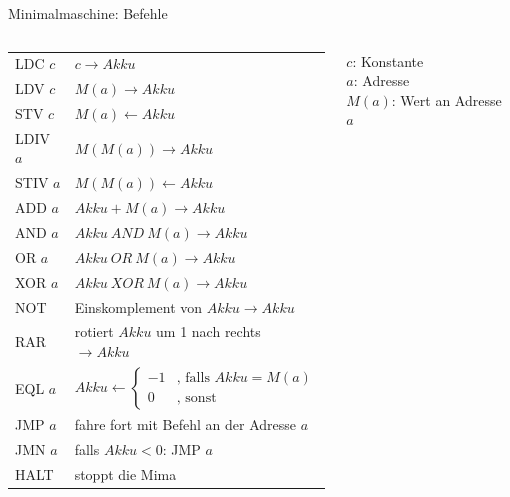 \begin{frame}{Minimalmaschine: Befehle}\small
\begin{columns}
	\begin{column}{0.6\textwidth}
		\begin{tabular}{|l|l|}
			\toprule
				LDC $c$ & $c \rightarrow Akku$ \\
				LDV $c$ & $M(a) \rightarrow Akku$ \\
				STV $c$ & $M(a) \leftarrow Akku$ \\
				LDIV $a$ & $M(M(a)) \rightarrow Akku$ \\
				STIV $a$ &$M(M(a)) \leftarrow Akku$ \\
				\midrule
				ADD $a$ & $Akku + M(a) \rightarrow Akku$ \\
				AND $a$ & $Akku \ AND \ M(a) \rightarrow Akku$ \\
				OR $a$ & $Akku \ OR \ M(a) \rightarrow Akku$\\
				XOR $a$ & $Akku \ XOR \ M(a) \rightarrow Akku$\\
				NOT & Einskomplement von $Akku \rightarrow Akku$\\
				RAR & rotiert $Akku$ um 1 nach rechts $\rightarrow Akku$\\
				\midrule
				EQL $a$ & $Akku \leftarrow \begin{cases}
											-1 & \text{, falls } Akku = M(a) \\
											0 & \text{, sonst} 
											\end{cases}$\\
				\midrule
				JMP $a$ & fahre fort mit Befehl an der Adresse $a$\\
				JMN $a$ & falls $Akku < 0$: JMP $a$\\
				HALT & stoppt die Mima\\
			\bottomrule	
		\end{tabular}
	\end{column}

	\begin{column}{0.32\textwidth}
		$c$: Konstante \\
		$a$: Adresse \\
		$M(a)$: Wert an Adresse $a$
	\end{column}
\end{columns}
\end{frame}

